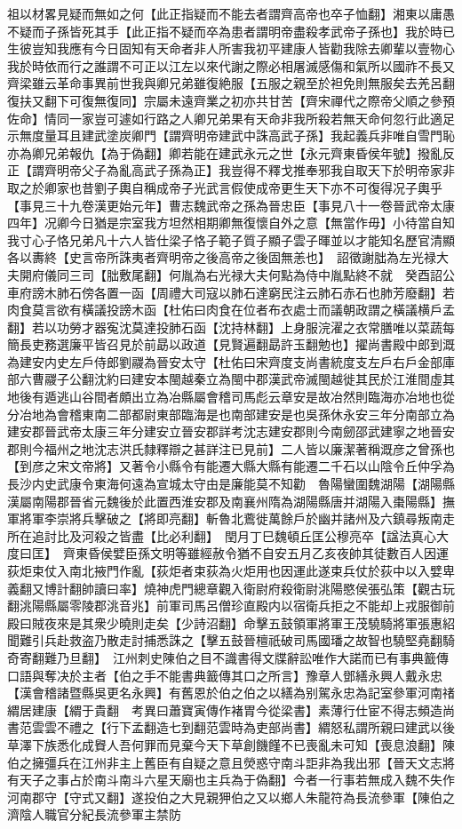 祖以材畧見疑而無如之何【此正指疑而不能去者謂齊高帝也卒子恤翻】湘東以庸愚不疑而子孫皆死其手【此正指不疑而卒為患者謂明帝盡殺孝武帝子孫也】我於時已生彼豈知我應有今日固知有天命者非人所害我初平建康人皆勸我除去卿輩以壹物心我於時依而行之誰謂不可正以江左以來代謝之際必相屠滅感傷和氣所以國祚不長又齊梁雖云革命事異前世我與卿兄弟雖復絶服【五服之親至於袒免則無服矣去羌呂翻復扶又翻下可復無復同】宗屬未遠齊業之初亦共甘苦【齊宋禪代之際帝父順之參預佐命】情同一家豈可遽如行路之人卿兄弟果有天命非我所殺若無天命何忽行此適足示無度量耳且建武塗炭卿門【謂齊明帝建武中誅高武子孫】我起義兵非唯自雪門恥亦為卿兄弟報仇【為于偽翻】卿若能在建武永元之世【永元齊東昏侯年號】撥亂反正【謂齊明帝父子為亂高武子孫為正】我豈得不釋戈推奉邪我自取天下於明帝家非取之於卿家也昔劉子輿自稱成帝子光武言假使成帝更生天下亦不可復得况子輿乎【事見三十九卷漢更始元年】曹志魏武帝之孫為晉忠臣【事見八十一卷晉武帝太康四年】况卿今日猶是宗室我方坦然相期卿無復懷自外之意【無當作毋】小待當自知我寸心子恪兄弟凡十六人皆仕梁子恪子範子質子顯子雲子暉並以才能知名歷官清顯各以夀終【史言帝所誅夷者齊明帝之後高帝之後固無恙也】　詔徵謝朏為左光禄大夫開府儀同三司【朏敷尾翻】何胤為右光禄大夫何點為侍中胤點終不就　癸酉詔公車府謗木肺石傍各置一函【周禮大司寇以肺石達窮民注云肺石赤石也肺芳廢翻】若肉食莫言欲有橫議投謗木函【杜佑曰肉食在位者布衣處士而議朝政謂之橫議横戶孟翻】若以功勞才器寃沈莫達投肺石函【沈持林翻】上身服浣濯之衣常膳唯以菜蔬每簡長吏務選廉平皆召見於前勗以政道【見賢遍翻勗許玉翻勉也】擢尚書殿中郎到溉為建安内史左戶侍郎劉鬷為晉安太守【杜佑曰宋齊度支尚書統度支左戶右戶金部庫部六曹鬷子公翻沈約曰建安本閩越秦立為閩中郡漢武帝滅閩越徙其民於江淮間虛其地後有遁逃山谷間者頗出立為冶縣屬會稽司馬彪云章安是故冶然則臨海亦冶地也從分冶地為會稽東南二部都尉東部臨海是也南部建安是也吳孫休永安三年分南部立為建安郡晉武帝太康三年分建安立晉安郡詳考沈志建安郡則今南劒邵武建寧之地晉安郡則今福州之地沈志洪氏隸釋辯之甚詳注已見前】二人皆以廉潔著稱溉彦之曾孫也【到彦之宋文帝將】又著令小縣令有能遷大縣大縣有能遷二千石以山陰令丘仲孚為長沙内史武康令東海何遠為宣城太守由是廉能莫不知勸　魯陽蠻圍魏湖陽【湖陽縣漢屬南陽郡晉省元魏後於此置西淮安郡及南襄州隋為湖陽縣唐并湖陽入棗陽縣】撫軍將軍李崇將兵擊破之【將即亮翻】斬魯北鷰徙萬餘戶於幽并諸州及六鎮尋叛南走所在追討比及河殺之皆盡【比必利翻】　閏月丁巳魏頓丘匡公穆亮卒【諡法真心大度曰匡】　齊東昏侯嬖臣孫文明等雖經赦令猶不自安五月乙亥夜帥其徒數百人因運荻炬束仗入南北掖門作亂【荻炬者束荻為火炬用也因運此遂束兵仗於荻中以入嬖卑義翻又博計翻帥讀曰率】燒神虎門總章觀入衛尉府殺衛尉洮陽愍侯張弘策【觀古玩翻洮陽縣屬零陵郡洮音兆】前軍司馬呂僧珍直殿内以宿衛兵拒之不能却上戎服御前殿曰賊夜來是其衆少曉則走矣【少詩沼翻】命擊五鼓領軍將軍王茂驍騎將軍張惠紹聞難引兵赴救盗乃散走討捕悉誅之【擊五鼓晉檀祇破司馬國璠之故智也驍堅堯翻騎奇寄翻難乃旦翻】　江州刺史陳伯之目不識書得文牒辭訟唯作大諾而已有事典籖傳口語與奪决於主者【伯之手不能書典籖傳其口之所言】豫章人鄧繕永興人戴永忠【漢會稽諸暨縣吳更名永興】有舊恩於伯之伯之以繕為别駕永忠為記室參軍河南禇緭居建康【緭于貴翻　考異曰蕭寶寅傳作褚胃今從梁書】素薄行仕宦不得志頻造尚書范雲雲不禮之【行下孟翻造七到翻范雲時為吏部尚書】緭怒私謂所親曰建武以後草澤下族悉化成䝿人吾何罪而見棄今天下草創饑饉不已喪亂未可知【喪息浪翻】陳伯之擁彊兵在江州非主上舊臣有自疑之意且熒惑守南斗詎非為我出邪【晉天文志將有天子之事占於南斗南斗六星天廟也主兵為于偽翻】今者一行事若無成入魏不失作河南郡守【守式又翻】遂投伯之大見親狎伯之又以鄉人朱龍符為長流參軍【陳伯之濟陰人職官分紀長流參軍主禁防
